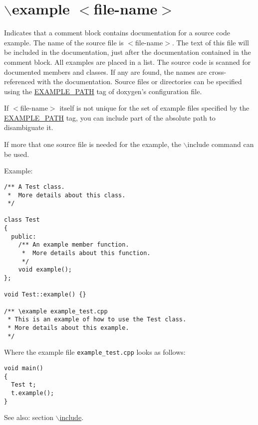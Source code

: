  \hypertarget{commands_cmdexample}{}\section{$\backslash$example $<$file-name$>$}\label{commands_cmdexample}
 Indicates that a comment block contains documentation for a source code example. The name of the source file is $<$file-name$>$. The text of this file will be included in the documentation, just after the documentation contained in the comment block. All examples are placed in a list. The source code is scanned for documented members and classes. If any are found, the names are cross-referenced with the documentation. Source files or directories can be specified using the \hyperlink{config_cfg_example_path}{EXAMPLE\_\-PATH} tag of doxygen's configuration file.

If $<$file-name$>$ itself is not unique for the set of example files specified by the \hyperlink{config_cfg_example_path}{EXAMPLE\_\-PATH} tag, you can include part of the absolute path to disambiguate it.

If more that one source file is needed for the example, the $\backslash$include command can be used.

\begin{Desc}
\item[Example:]

\begin{VerbInclude}\begin{verbatim}/** A Test class.
 *  More details about this class.
 */

class Test
{
  public:
    /** An example member function.
     *  More details about this function.
     */
    void example();
};

void Test::example() {}

/** \example example_test.cpp
 * This is an example of how to use the Test class.
 * More details about this example.
 */
\end{verbatim}
\end{VerbInclude}
 Where the example file {\tt example\_\-test.cpp} looks as follows: 

\begin{VerbInclude}\begin{verbatim}void main()
{
  Test t;
  t.example();
}
\end{verbatim}
\end{VerbInclude}
 \end{Desc}
\begin{Desc}
\item[See also:]section \hyperlink{commands_cmdinclude}{$\backslash$include}.\end{Desc}



